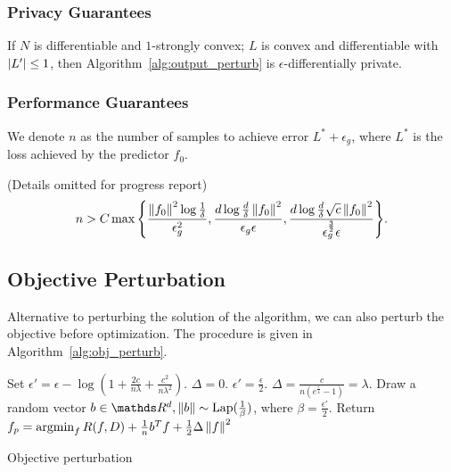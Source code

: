 \documentclass{article} %
\begin{document}
\subsubsection{Privacy Guarantees}
\begin{theorem}
If $N$ is differentiable and $1$-strongly convex; $L$ is convex and differentiable with $\left\lvert L'\right\rvert \le 1$, then Algorithm~\ref{alg:output_perturb} is $\epsilon$-differentially private.
\end{theorem}

\subsubsection{Performance Guarantees}
We denote $n$ as the number of samples to achieve error $L^* + \epsilon_g$, where $L^*$ is the loss achieved by the predictor $f_0$.

\begin{theorem} (Details omitted for progress report)
$$n > C\max{\left\{\frac{\left\lVert f_0\right\rVert^2 \log{\frac{1}{\delta}}}{\epsilon_g^2}, \frac{d\log{\frac{d}{\delta}}\left\lVert f_0\right\rVert^2}{\epsilon_g \epsilon}, \frac{d\log{\frac{d}{\delta}}\sqrt{c} \left\lVert f_0\right\rVert^2}{\epsilon_g^{\frac{3}{2}}\epsilon}\right\}}.$$
\end{theorem}


\subsection{Objective Perturbation}
Alternative to perturbing the solution of the algorithm, we can also perturb the objective before optimization. The procedure is given in Algorithm~\ref{alg:obj_perturb}.

\begin{algorithm}[htb]
\begin{algorithmic}[1]
    \State Set $\epsilon' = \epsilon - \log{(1 + \frac{2c}{n\lambda} + \frac{c^2}{n\lambda^2})}$.
	\State $\Delta = 0$.
    \Else
	\State $\epsilon' = \frac{\epsilon}{2}$.
	\State $\Delta = \frac{c}{n(e^{\frac{\epsilon}{4}} - 1)} = \lambda$.
    \EndIf
    \State Draw a random vector $b\in \R^d, \norm{b}\sim \text{Lap}(\frac{1}{\beta})$, where $\beta = \frac{\epsilon'}{2}$.
    \State Return $f_{p} = \operatorname*{argmin}_f R(f, D) + \frac{1}{n} b^T f + \frac{1}{2}\Delta\left\lVert f\right\rVert^2 $
   \EndFunction
\end{algorithmic}
\caption{Objective perturbation}\label{alg:obj_perturb}
\end{algorithm}
\end{document}
